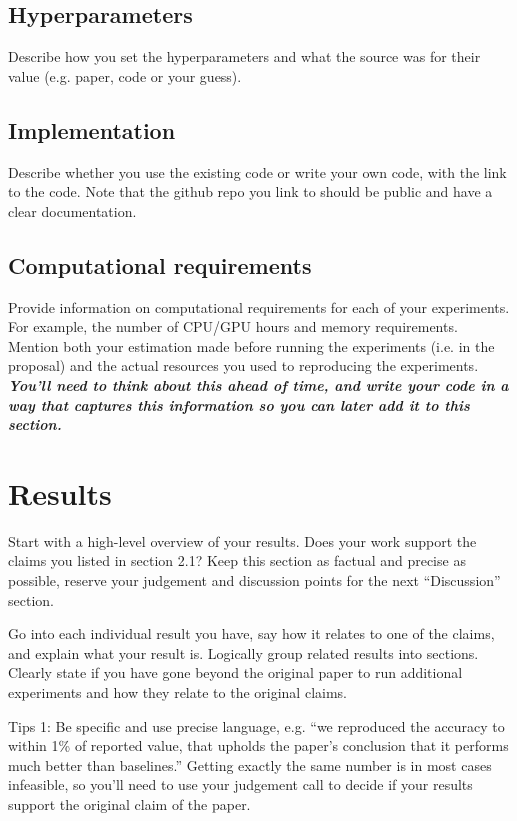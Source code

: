 \documentclass[11pt,a4paper]{article}
\begin{document}
\subsection{Hyperparameters}
Describe how you set the hyperparameters and what the source was for their value (e.g. paper, code or your guess). 

\subsection{Implementation}
Describe whether you use the existing code or write your own code, with the link to the code. Note that the github repo you link to should be public and have a clear documentation.

\subsection{Computational requirements}
Provide information on computational requirements for each of your experiments. For example, the number of CPU/GPU hours and memory requirements.
Mention both your estimation made before running the experiments (i.e. in the proposal) and the actual resources you used to reproducing the experiments. 
\textbf{\textit{You'll need to think about this ahead of time, and write your code in a way that captures this information so you can later add it to this section.} }

\section{Results}
Start with a high-level overview of your results. Does your work support the claims you listed in section 2.1? Keep this section as factual and precise as possible, reserve your judgement and discussion points for the next ``Discussion'' section. 

Go into each individual result you have, say how it relates to one of the claims, and explain what your result is. Logically group related results into sections. Clearly state if you have gone beyond the original paper to run additional experiments and how they relate to the original claims. 

Tips 1: Be specific and use precise language, e.g. ``we reproduced the accuracy to within 1\% of reported value, that upholds the paper's conclusion that it performs much better than baselines.'' Getting exactly the same number is in most cases infeasible, so you'll need to use your judgement call to decide if your results support the original claim of the paper. 
\end{document}
